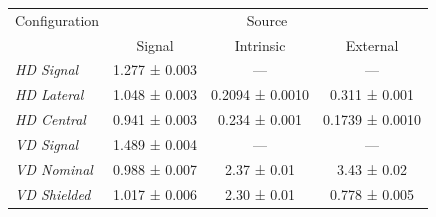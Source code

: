 \begin{tabular}{lccc}
    \toprule
    Configuration & \multicolumn{3}{c}{Source} \\
     & Signal & Intrinsic & External \\
    \midrule
    \emph{HD Signal} & 1.277 ± 0.003 & --- & --- \\
    \emph{HD Lateral} & 1.048 ± 0.003 & 0.2094 ± 0.0010 & 0.311 ± 0.001 \\
    \emph{HD Central} & 0.941 ± 0.003 & 0.234 ± 0.001 & 0.1739 ± 0.0010 \\
    \emph{VD Signal} & 1.489 ± 0.004 & --- & --- \\
    \emph{VD Nominal} & 0.988 ± 0.007 & 2.37 ± 0.01 & 3.43 ± 0.02 \\
    \emph{VD Shielded} & 1.017 ± 0.006 & 2.30 ± 0.01 & 0.778 ± 0.005 \\
    \bottomrule
\end{tabular}
